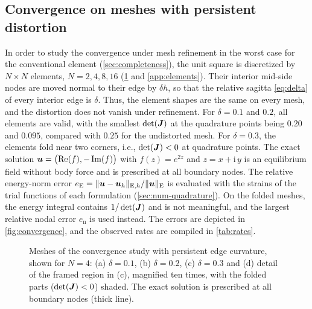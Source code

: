 \begin{table}[htbp]
  \centering\small
  \caption{Patch tests on the folded panel meshes of Rajendran~\cite{Rajendran2010technique} ($2\times2$ elements, interior mid-side nodes rotated by $\theta$): largest relative nodal error over the tension, bending and shear load cases.}
  \label{tab:panel}
  
\end{table}
%
\subsection{Convergence on meshes with persistent distortion}
\label{sec:num-convergence}
%
In order to study the convergence under mesh refinement in the worst case for the conventional element (\cref{sec:completeness}), the unit square is discretized by $N\times N$ elements, $N=2,4,8,16$ (\cref{fig:square} and \cref{app:elements}). Their interior mid-side nodes are moved normal to their edge by $\delta h$, so that the relative sagitta \cref{eq:delta} of every interior edge is $\delta$. Thus, the element shapes are the same on every mesh, and the distortion does not vanish under refinement. For $\delta=0.1$ and $0.2$, all elements are valid, with the smallest $\det(\bm{J})$ at the quadrature points being $0.20$ and $0.095$, compared with $0.25$ for the undistorted mesh. For $\delta=0.3$, the elements fold near two corners, i.e., $\det(\bm{J})<0$ at quadrature points. The exact solution $\bm{u}=\bigl(\operatorname{Re}(f),-\operatorname{Im}(f)\bigr)$ with $f(z)=e^{2z}$ and $z=x+\mathrm i\,y$ is an equilibrium field without body force and is prescribed at all boundary nodes. The relative energy-norm error $e_{\mathrm{E}}=\lVert \bm{u}-\bm{u}_h\rVert_{\mathrm{E},h}/\lVert \bm{u}\rVert_{\mathrm{E}}$ is evaluated with the strains of the trial functions of each formulation (\cref{sec:num-quadrature}). On the folded meshes, the energy integral contains $1/\det(\bm{J})$ and is not meaningful, and the largest relative nodal error $e_{\mathrm{n}}$ is used instead. The errors are depicted in \cref{fig:convergence}, and the observed rates are compiled in \cref{tab:rates}.

\begin{figure}[htbp]
  \centering
  
  \caption{Meshes of the convergence study with persistent edge curvature, shown for $N=4$: (a) $\delta=0.1$, (b) $\delta=0.2$, (c) $\delta=0.3$ and (d) detail of the framed region in (c), magnified ten times, with the folded parts ($\det(\bm{J})<0$) shaded. The exact solution is prescribed at all boundary nodes (thick line).}
  \label{fig:square}
\end{figure}

